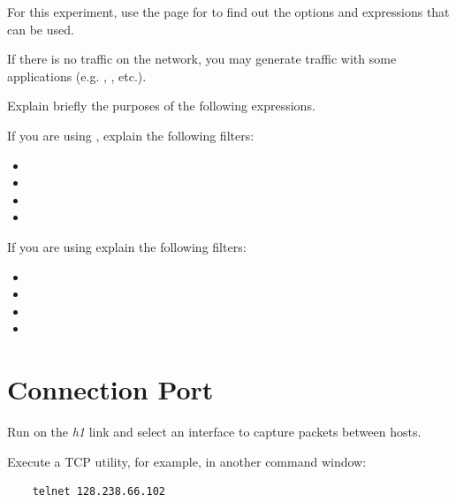 \documentclass{../UTNetLab}
\begin{document}
For this experiment, use the  page for  to find out the options and
expressions that can be used.

If there is no traffic on the network, you may generate traffic with some applications
(e.g. , , etc.).

\begin{report}
    \item Explain briefly the purposes of the following  expressions.
\end{report}

If you are using , explain the following filters:
\begin{itemize}
    \item {}
    \item {}
    \item {}
    \item {}
\end{itemize}

If you are using  explain the following filters:
\begin{itemize}
    \item {}
    \item {}
    \item {}
    \item {}
\end{itemize}

\section{Connection Port}
Run  on the \textit{h1} link and select an interface to capture packets between hosts.

Execute a TCP utility,  for example, in another command window:

\begin{lstlisting}
	telnet 128.238.66.102
\end{lstlisting}
\end{document}
